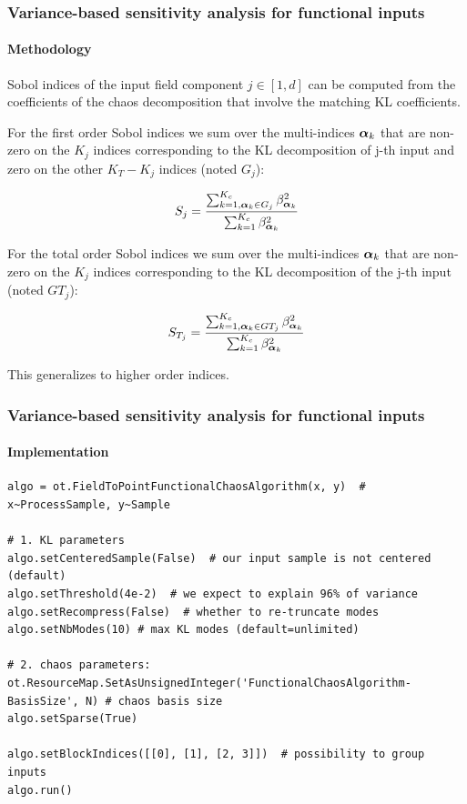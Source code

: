 \documentclass[aspectratio=169]{beamer}
\begin{document}
\begin{frame}
\frametitle{Variance-based sensitivity analysis for functional inputs}

\framesubtitle{Methodology}

Sobol indices of the input field component $j \in [1,d]$ can be computed
from the coefficients of the chaos decomposition that involve the
matching KL coefficients.

For the first order Sobol indices we sum over the multi-indices ${\mathbf{\boldsymbol{{\alpha}}}}_k$
that are non-zero on the $K_j$ indices corresponding to the KL
decomposition of j-th input and zero on the other $K_T - K_j$ indices (noted $G_j$):

$$
S_j = \frac{\sum_{k=1, {\mathbf{\boldsymbol{{\alpha}}}}_k \in G_j}^{K_c} \beta_{{\mathbf{\boldsymbol{{\alpha}}}}_k}^2}{\sum_{k=1}^{K_c} \beta_{{\mathbf{\boldsymbol{{\alpha}}}}_k}^2}
$$

For the total order Sobol indices we sum over the multi-indices ${\mathbf{\boldsymbol{{\alpha}}}}_k$
that are non-zero on the $K_j$ indices corresponding to the KL
decomposition of the j-th input (noted $GT_j$):

$$
S_{T_j} = \frac{\sum_{k=1, {\mathbf{\boldsymbol{{\alpha}}}}_k \in GT_j}^{K_c} \beta_{{\mathbf{\boldsymbol{{\alpha}}}}_k}^2}{\sum_{k=1}^{K_c} \beta_{{\mathbf{\boldsymbol{{\alpha}}}}_k}^2} 
$$

This generalizes to higher order indices.

\end{frame}


\begin{frame}[containsverbatim]
\frametitle{Variance-based sensitivity analysis for functional inputs}

\framesubtitle{Implementation}

\lstset{language=python}
\begin{lstlisting}
algo = ot.FieldToPointFunctionalChaosAlgorithm(x, y)  # x~ProcessSample, y~Sample

# 1. KL parameters
algo.setCenteredSample(False)  # our input sample is not centered (default)
algo.setThreshold(4e-2)  # we expect to explain 96% of variance
algo.setRecompress(False)  # whether to re-truncate modes
algo.setNbModes(10) # max KL modes (default=unlimited)

# 2. chaos parameters:
ot.ResourceMap.SetAsUnsignedInteger('FunctionalChaosAlgorithm-BasisSize', N) # chaos basis size
algo.setSparse(True)

algo.setBlockIndices([[0], [1], [2, 3]])  # possibility to group inputs
algo.run()
\end{lstlisting}

\end{frame}
\end{document}
